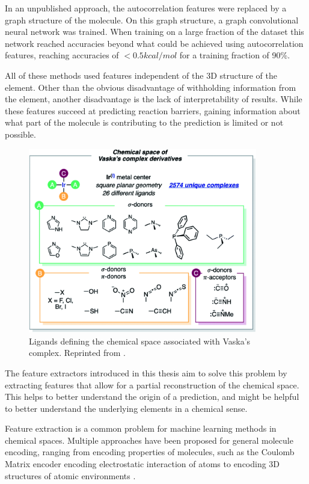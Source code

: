 In an unpublished approach, the autocorrelation features were replaced by a graph structure of the molecule.
On this graph structure, a graph convolutional neural network was trained.
When training on a large fraction of the dataset this network reached accuracies 
beyond what could be achieved using autocorrelation features, reaching accuracies of $<0.5 kcal/mol$ for a training fraction of 90\%.

All of these methods used features independent of the 3D structure of the element.
Other than the obvious disadvantage of withholding information from the element, another disadvantage is the lack of interpretability of results.
While these features succeed at predicting reaction barriers, gaining 
information about what part of the molecule is contributing to the prediction is limited or not possible.

\begin{figure}[H]
  \centering
  \includegraphics[width=10cm]{figures/introduction/chem-space.png}
  \caption[Vaska's space]{Ligands defining the chemical space associated with Vaska's complex. Reprinted from \cite{friederich_dos}.}
  \label{fig:chemspace}
\end{figure}

The feature extractors introduced in this thesis aim to solve this problem by extracting features that allow for a
partial reconstruction of the chemical space.
This helps to better understand the origin of a prediction, and might be helpful to better understand 
the underlying elements in a chemical sense.

Feature extraction is a common problem for machine learning methods in chemical spaces.
Multiple approaches have been proposed for general molecule encoding, 
ranging from encoding properties of molecules, such as the Coulomb Matrix encoder encoding electrostatic interaction of atoms \cite{PhysRevLett.108.058301}
to encoding 3D structures of atomic environments \cite{Bart_k_2013}.

